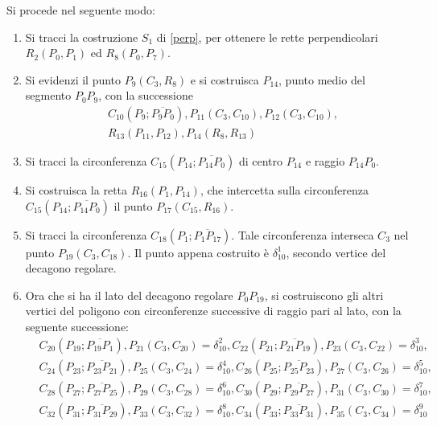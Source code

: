 Si procede nel seguente modo:
\begin{enumerate}

\item Si tracci la costruzione $S_1$ di \ref{perp}, per ottenere le rette perpendicolari $R_{2}(P_{0}, P_{1})$ ed $R_{8}(P_{0}, P_{7})$.

\item Si evidenzi il punto $P_{9}(C_{3}, R_{8})$ e si costruisca $P_{14}$, punto medio del segmento $P_{0}P_{9}$, con la successione
\begin{align*}
&C_{10}(P_{9};\overline{P_{9} P_{0}}), P_{11}(C_{3}, C_{10}), P_{12}(C_{3}, C_{10}), \\
&R_{13}(P_{11}, P_{12}), P_{14}(R_{8}, R_{13})
\end{align*}

\item Si tracci la circonferenza $C_{15}(P_{14};\overline{P_{14} P_{0}})$ di centro $P_{14}$ e raggio $P_{14}P_{0}$. 

\item Si costruisca la retta $R_{16}(P_{1}, P_{14})$, che intercetta sulla circonferenza $C_{15}(P_{14};\overline{P_{14} P_{0}})$ il punto $P_{17}(C_{15}, R_{16})$.

\item Si tracci la circonferenza $C_{18}(P_{1};\overline{P_{1} P_{17}})$. Tale circonferenza interseca $C_{3}$ nel punto $P_{19}(C_{3},C_{18})$. Il punto appena costruito è $\delta_{10}^{1}$, secondo vertice del decagono regolare.

\item Ora che si ha il lato del decagono regolare $P_{0}P_{19}$, si costruiscono gli altri vertici del poligono con circonferenze successive di raggio pari al lato, con la seguente successione:
\begin{align*}
&C_{20}(P_{19};\overline{P_{19} P_{1}}), P_{21}(C_{3}, C_{20}) = \delta_{10}^{2}, C_{22}(P_{21};\overline{P_{21} P_{19}}), P_{23}(C_{3}, C_{22}) = \delta_{10}^{3}, \\
&C_{24}(P_{23};\overline{P_{23} P_{21}}), P_{25}(C_{3}, C_{24})= \delta_{10}^{4}, C_{26}(P_{25};\overline{P_{25} P_{23}}), P_{27}(C_{3}, C_{26})= \delta_{10}^{5}, \\
&C_{28}(P_{27};\overline{P_{27} P_{25}}), P_{29}(C_{3}, C_{28}) = \delta_{10}^{6}, C_{30}(P_{29};\overline{P_{29} P_{27}}), P_{31}(C_{3}, C_{30})= \delta_{10}^{7}, \\
&C_{32}(P_{31};\overline{P_{31} P_{29}}), P_{33}(C_{3}, C_{32})= \delta_{10}^{8}, C_{34}(P_{33};\overline{P_{33} P_{31}}), P_{35}(C_{3}, C_{34})= \delta_{10}^{9}
\end{align*}

\end{enumerate}

